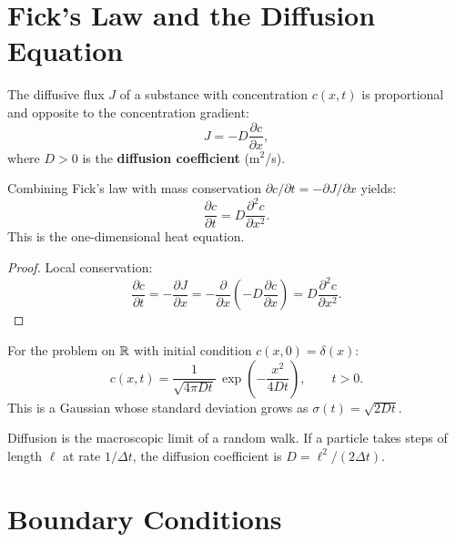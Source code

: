 \section{Fick's Law and the Diffusion Equation}
\label{sec:fick}

\begin{definition}
The diffusive flux $J$ of a substance with concentration $c(x,t)$ is
proportional and opposite to the concentration gradient:
\[
  J = -D\frac{\partial c}{\partial x},
\]
where $D>0$ is the \textbf{diffusion coefficient} (m$^2$/s).
\end{definition}

\begin{theorem}
Combining Fick's law with mass conservation
$\partial c/\partial t = -\partial J/\partial x$ yields:
\[
  \frac{\partial c}{\partial t} = D\frac{\partial^2 c}{\partial x^2}.
\]
This is the one-dimensional heat equation.
\end{theorem}

\begin{proof}
Local conservation:
\[
  \frac{\partial c}{\partial t} = -\frac{\partial J}{\partial x}
  = -\frac{\partial}{\partial x}\!\left(-D\frac{\partial c}{\partial x}\right)
  = D\frac{\partial^2 c}{\partial x^2}.
\]
\end{proof}

\begin{keyformulas}[title=\textbf{Fundamental solution (heat kernel)}]
For the problem on $\mathbb{R}$ with initial condition $c(x,0)=\delta(x)$:
\[
  c(x,t) = \frac{1}{\sqrt{4\pi Dt}}\,\exp\!\left(-\frac{x^2}{4Dt}\right),
  \qquad t>0.
\]
This is a Gaussian whose standard deviation grows as $\sigma(t)=\sqrt{2Dt}$.
\end{keyformulas}

\begin{intuition}[title=\textbf{Diffusion and random walks}]
Diffusion is the macroscopic limit of a random walk.  If a particle
takes steps of length $\ell$ at rate $1/\Delta t$, the diffusion
coefficient is $D=\ell^2/(2\Delta t)$.
\end{intuition}

\section{Boundary Conditions}

